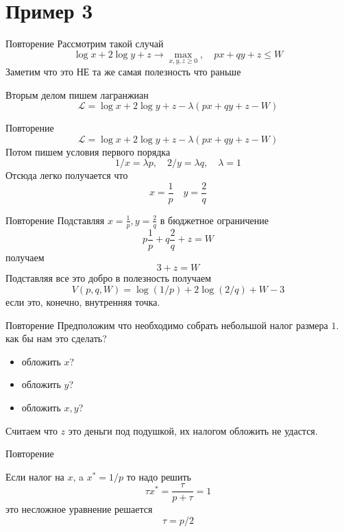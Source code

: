\documentclass{beamer}
\begin{document}
\section{Пример 3}

\begin{frame}{Повторение}
Рассмотрим такой случай
$$ \log x + 2 \log y + z \to \max_{x,y,z \geqslant 0}, \quad px + qy + z \leqslant W$$
Заметим что это НЕ та же самая полезность что раньше

Вторым делом пишем лагранжиан
$$\mathcal{L} = \log x + 2 \log y + z - \lambda (px + qy + z - W)$$
\end{frame}

\begin{frame}{Повторение}
$$\mathcal{L} = \log x + 2 \log y + z - \lambda (px + qy + z - W)$$
Потом пишем условия первого порядка
$$ 1/x = \lambda p, \quad 2/y = \lambda q, \quad \lambda = 1$$
Отсюда легко получается что
$$ x = \frac{1}{p} \quad y = \frac{2}{q}$$
\end{frame}

\begin{frame}{Повторение}
Подставляя $x = \frac{1}{p}, y = \frac{2}{q}$ в бюджетное ограничение
$$ p\frac{1}{p} + q\frac{2}{q} + z = W $$
получаем
$$ 3 + z = W$$
Подставляя все это добро в полезность получаем
$$ V(p,q,W) = \log(1/p) + 2 \log(2/q) + W - 3$$
если это, конечно, внутренняя точка.
\end{frame}

\begin{frame}{Повторение}
Предположим что необходимо собрать небольшой налог размера $1$. как бы нам это сделать?

\begin{itemize}
  \item обложить $x$?
  \item обложить $y$?
  \item обложить $x,y$?
\end{itemize}

Считаем что $z$ это деньги под подушкой, их налогом обложить не удастся.

\end{frame}

\begin{frame}{Повторение}

Если налог на $x$, a $x^* = 1/p$ то надо решить
$$ \tau x^* = \frac{\tau}{p+\tau} = 1$$
это несложное уравнение решается
$$ \tau = p/2$$

\end{frame}
\end{document}
